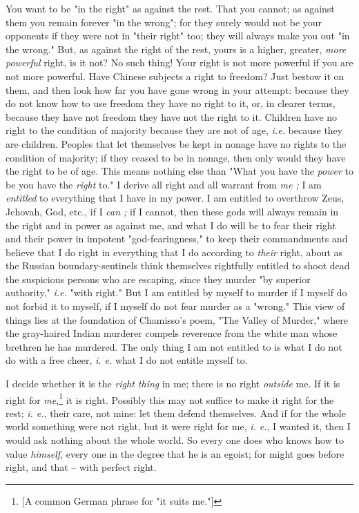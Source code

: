 You want to be "{}in the right"{} as against the rest. That you cannot; as 
against them you remain forever "{}in the wrong"{}; for they surely would not 
be your opponents if they were not in "{}their right"{} too; they will always 
make you out "{}in the wrong."{} But, as against the right of the rest, yours 
is a higher, greater, \textit{more powerful} right, is it not? No such thing! 
Your right is not more powerful if you are not more powerful. Have Chinese 
subjects a right to freedom? Just bestow it on them, and then look how far you 
have gone wrong in your attempt: because they do not know how to use freedom 
they have no right to it, or, in clearer terms, because they have not freedom 
they have not the right to it. Children have no right to the condition of 
majority because they are not of age, \textit{i.e.} because they are children. 
Peoples that let themselves be kept in nonage have no rights to the condition 
of majority; if they ceased to be in nonage, then only would they have the 
right to be of age. This means nothing else than "{}What you have the 
\textit{power} to be you have the \textit{right} to."{} I derive all right and 
all warrant from \textit{me ;} I am \textit{entitled} to everything that I 
have in my power. I am entitled to overthrow Zeus, Jehovah, God, etc., if I 
\textit{can ;} if I cannot, then these gods will always remain in the right 
and in power as against me, and what I do will be to fear their right and 
their power in impotent "{}god-fearingness,"{} to keep their commandments and 
believe that I do right in everything that I do according to \textit{their} 
right, about as the Russian boundary-sentinels think themselves rightfully 
entitled to shoot dead the suspicious persons who are escaping, since they 
murder "{}by superior authority,"{} \textit{i.e.} "{}with right."{} But I am 
entitled by myself to murder if I myself do not forbid it to myself, if I 
myself do not fear murder as a "{}wrong."{} This view of things lies at the 
foundation of Chamisso's poem, "{}The Valley of Murder,"{} where the 
gray-haired Indian murderer compels reverence from the white man whose 
brethren he has murdered. The only thing I am not entitled to is what I do not 
do with a free cheer, \textit{i. e.} what I do not entitle myself to.

I decide whether it is the \textit{right thing} in me; there is no right 
\textit{outside} me. If it is right for \textit{me},\footnote{[A common German 
phrase for "{}it suits me."{}]} it is right. Possibly this may not suffice to 
make it right for the rest; \textit{i. e.}, their care, not mine: let them 
defend themselves. And if for the whole world something were not right, but it 
were right for me, \textit{i. e.}, I wanted it, then I would ask nothing about 
the whole world. So every one does who knows how to value \textit{himself}, 
every one in the degree that he is an egoist; for might goes before right, and 
that -- with perfect right.

